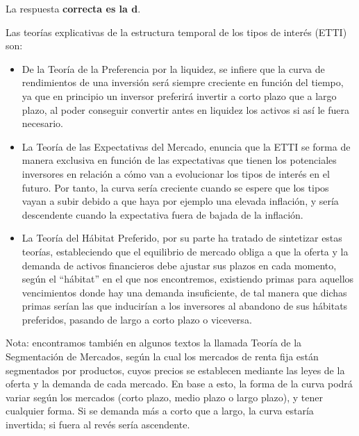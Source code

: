 \documentclass[
  letterpaper,
  DIV=11,
  numbers=noendperiod]{scrreprt}
\begin{document}
\begin{tcolorbox}[enhanced jigsaw, left=2mm, opacityback=0, colback=white, breakable, arc=.35mm, bottomrule=.15mm, rightrule=.15mm, toprule=.15mm, leftrule=.75mm, colframe=quarto-callout-tip-color-frame]
\begin{minipage}[t]{5.5mm}
\textcolor{quarto-callout-tip-color}{\faLightbulb}
\end{minipage}%
\begin{minipage}[t]{\textwidth - 5.5mm}

La respuesta \textbf{correcta es la d}.

Las teorías explicativas de la estructura temporal de los tipos de
interés (ETTI) son:

\begin{itemize}
\item
  De la Teoría de la Preferencia por la liquidez, se infiere que la
  curva de rendimientos de una inversión será siempre creciente en
  función del tiempo, ya que en principio un inversor preferirá invertir
  a corto plazo que a largo plazo, al poder conseguir convertir antes en
  liquidez los activos si así le fuera necesario.
\item
  La Teoría de las Expectativas del Mercado, enuncia que la ETTI se
  forma de manera exclusiva en función de las expectativas que tienen
  los potenciales inversores en relación a cómo van a evolucionar los
  tipos de interés en el futuro. Por tanto, la curva sería creciente
  cuando se espere que los tipos vayan a subir debido a que haya por
  ejemplo una elevada inflación, y sería descendente cuando la
  expectativa fuera de bajada de la inflación.
\item
  La Teoría del Hábitat Preferido, por su parte ha tratado de sintetizar
  estas teorías, estableciendo que el equilibrio de mercado obliga a que
  la oferta y la demanda de activos financieros debe ajustar sus plazos
  en cada momento, según el ``hábitat'' en el que nos encontremos,
  existiendo primas para aquellos vencimientos donde hay una demanda
  insuficiente, de tal manera que dichas primas serían las que
  inducirían a los inversores al abandono de sus hábitats preferidos,
  pasando de largo a corto plazo o viceversa.
\end{itemize}

Nota: encontramos también en algunos textos la llamada Teoría de la
Segmentación de Mercados, según la cual los mercados de renta fija están
segmentados por productos, cuyos precios se establecen mediante las
leyes de la oferta y la demanda de cada mercado. En base a esto, la
forma de la curva podrá variar según los mercados (corto plazo, medio
plazo o largo plazo), y tener cualquier forma. Si se demanda más a corto
que a largo, la curva estaría invertida; si fuera al revés sería
ascendente.

\end{minipage}%
\end{tcolorbox}
\end{document}
